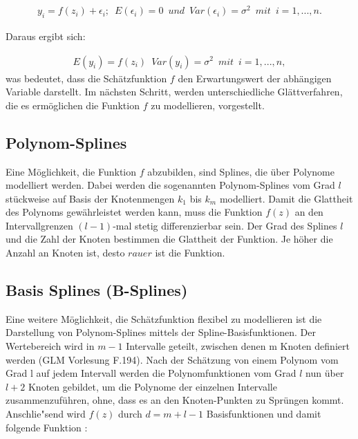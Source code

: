 \documentclass[12pt]{scrreprt}
\begin{document}
\begin{align}
y_{i}=f(z_{i})+\epsilon_{i};\enspace E(\epsilon_{i})=0 \enspace und \enspace Var(\epsilon_{i})=\sigma^2 \enspace mit \enspace i=1,...,n.
\end{align}

Daraus ergibt sich:

\begin{align}
E(y_{i})=f(z_{i}) \enspace Var(y_{i})=\sigma^2 \enspace mit \enspace i=1,...,n,
\end{align}
was bedeutet, dass die Schätzfunktion $f$ den Erwartungswert der abhängigen Variable darstellt. Im nächsten Schritt, werden unterschiedliche Glättverfahren, die es ermöglichen die Funktion $f$ zu modellieren, vorgestellt.



\subsection{Polynom-Splines}

Eine Möglichkeit, die Funktion $f$ abzubilden, sind Splines, die über Polynome modelliert werden. Dabei werden die sogenannten Polynom-Splines vom Grad $l$ stückweise auf Basis der Knotenmengen $k_{1}$ bis $k_{m}$ modelliert. Damit die Glattheit des Polynoms gewährleistet werden kann, muss die Funktion $f(z)$ an den Intervallgrenzen $(l-1)$-mal stetig differenzierbar sein. Der Grad des Splines $l$ und die Zahl der Knoten bestimmen die Glattheit der Funktion. Je höher die Anzahl an Knoten ist, desto $rauer$ ist die Funktion.



\subsection{Basis Splines (B-Splines)}

Eine weitere Möglichkeit, die Schätzfunktion flexibel zu modellieren ist die Darstellung von Polynom-Splines mittels der Spline-Basisfunktionen. Der Wertebereich wird in $m-1$ Intervalle geteilt, zwischen denen m Knoten definiert werden (GLM Vorlesung F.194). Nach der Schätzung von einem Polynom vom Grad l auf jedem Intervall werden die Polynomfunktionen vom Grad $l$ nun über $l + 2$ Knoten gebildet, um die Polynome der einzelnen Intervalle zusammenzuführen, ohne, dass es an den Knoten-Punkten zu Sprüngen kommt. Anschlie"send wird $f(z)$ durch $d = m+l-1$ Basisfunktionen und damit folgende Funktion :
\end{document}
